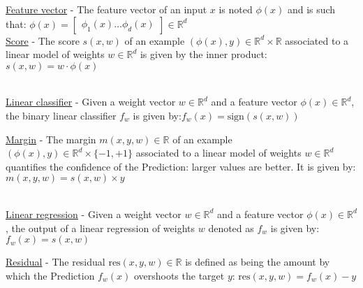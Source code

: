 \documentclass[4pt,landscape]{article}
\begin{document}
\begin{multicols*}{4}


\setlength{\premulticols}{1pt}
\setlength{\postmulticols}{1pt}
\setlength{\multicolsep}{1pt}
\setlength{\columnsep}{2pt}

{\tiny \underline{Feature vector} - The feature vector of an input  $x$ is noted $\phi(x)$ and is such that: \tiny${\phi(x)=\left[\begin{array}{c}\phi_1(x)\hdots\phi_d(x)\end{array}\right]\in\mathbb{R}^d}$}\\
{\tiny \underline{Score} - The score $s(x,w)$ of an example $(\phi(x),y) \in \mathbb{R}^d \times \mathbb{R}$ associated to a linear model of weights $w \in \mathbb{R}^d$ is given by the inner product: $s(x,w)=w\cdot\phi(x)$}

{\color{black}\hrulefill}\\
{\tiny \underline{Linear classifier} - Given a weight vector $w\in\mathbb{R}^d$ and a feature vector $\phi(x)\in\mathbb{R}^d$, the binary linear classifier $f_w$ is given by:$f_w(x)=\textrm{sign}(s(x,w))$}\par
{\tiny \underline{Margin} - The margin $m(x,y,w) \in \mathbb{R}$ of an example $(\phi(x),y) \in \mathbb{R}^d \times \{-1,+1\}$ associated to a linear model of weights $w\in \mathbb{R}^d$ quantifies the confidence of the Prediction: larger values are better. It is given by: $m(x,y,w)=s(x,w)\times y$}\par

{\color{black}\hrulefill}\\
{\tiny \underline{Linear regression} - Given a weight vector $w\in\mathbb{R}^d$ and a feature vector $\phi(x)\in\mathbb{R}^d$, the output of a linear regression of weights $w$ denoted as $f_w$ is given by:$f_w(x)=s(x,w)$}\par

{\tiny \underline{Residual} - The residual $\textrm{res}(x,y,w) \in \mathbb{R}$ is defined as being the amount by which the Prediction $f_w(x)$ overshoots the target $y$: $\textrm{res}(x,y,w)=f_w(x)-y$}\par


\end{multicols*}
\end{document}
